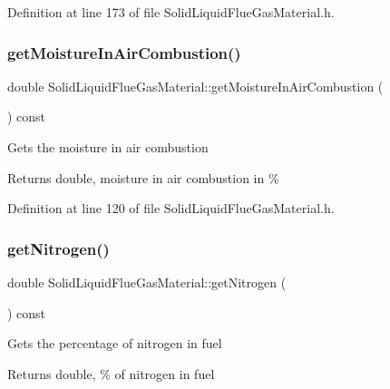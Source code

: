 Definition at line 173 of file Solid\+Liquid\+Flue\+Gas\+Material.\+h.

\mbox{\label{class_solid_liquid_flue_gas_material_ae3d9780851b8217ed2885753f11ec18b}} 
\subsubsection{\texorpdfstring{get\+Moisture\+In\+Air\+Combustion()}{getMoistureInAirCombustion()}}
{\footnotesize\ttfamily double Solid\+Liquid\+Flue\+Gas\+Material\+::get\+Moisture\+In\+Air\+Combustion (\begin{DoxyParamCaption}{ }\end{DoxyParamCaption}) const\hspace{0.3cm}{\ttfamily [inline]}}

Gets the moisture in air combustion \begin{DoxyReturn}{Returns}
double, moisture in air combustion in \% 
\end{DoxyReturn}


Definition at line 120 of file Solid\+Liquid\+Flue\+Gas\+Material.\+h.

\mbox{\label{class_solid_liquid_flue_gas_material_a76159a5d9d609f0e0131f7bca3b60ebc}} 
\subsubsection{\texorpdfstring{get\+Nitrogen()}{getNitrogen()}}
{\footnotesize\ttfamily double Solid\+Liquid\+Flue\+Gas\+Material\+::get\+Nitrogen (\begin{DoxyParamCaption}{ }\end{DoxyParamCaption}) const\hspace{0.3cm}{\ttfamily [inline]}}

Gets the percentage of nitrogen in fuel \begin{DoxyReturn}{Returns}
double, \% of nitrogen in fuel 
\end{DoxyReturn}


